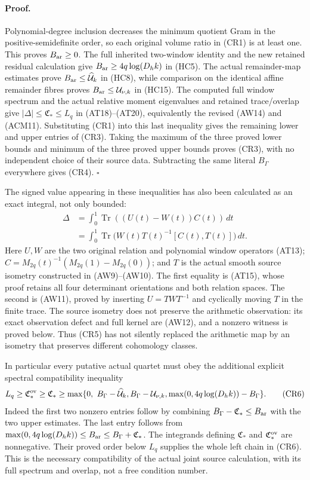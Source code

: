 \paragraph{Proof.}
Polynomial-degree inclusion decreases the minimum quotient Gram in
the positive-semidefinite order, so each original volume ratio in
(CR1) is at least one. This proves $B_{\rm ar}\ge0$.
The full inherited two-window identity and the new retained residual
calculation give $B_{\rm ar}\ge4q\log(D_hk)$ in (HC5).
The actual remainder-map estimates prove
$B_{\rm ar}\le\widehat{\mathcal U}_k$ in (HC8), while comparison
on the identical affine remainder fibres proves
$B_{\rm ar}\le\mathcal U_{\nu,k}$ in (HC15).
The computed full window spectrum and the actual relative moment
eigenvalues and retained trace/overlap give
$|\Delta|\le\mathfrak C_*\le L_q$ in (AT18)--(AT20),
equivalently the revised (AW14) and (ACM11).
Substituting (CR1) into this last inequality gives the remaining lower
and upper entries of (CR3). Taking the maximum of the three proved
lower bounds and minimum of the three proved upper bounds proves
(CR3), with no independent choice of their source data. Subtracting
the same literal $B_\Gamma$ everywhere gives (CR4).
\hfill$\square$

The signed value appearing in these inequalities has also been
calculated as an exact integral, not only bounded:
\[
\begin{split}
\Delta
 &=\int_0^1\operatorname{Tr}((U(t)-W(t))C(t))\,dt\\
 &=\int_0^1\operatorname{Tr}
       \bigl(W(t)T(t)^{-1}[C(t),T(t)]\bigr)\,dt .
\end{split}                                                   \tag{CR5}
\]
Here $U,W$ are the two original relation and polynomial window
operators (AT13); $C=M_{2q}(t)^{-1}(M_{2q}(1)-M_{2q}(0))$;
and $T$ is the actual smooth source isometry constructed in (AW9)--(AW10).
The first equality is (AT15), whose proof retains all four determinant
orientations and both relation spaces. The second is (AW11), proved
by inserting $U=TWT^{-1}$ and cyclically moving $T$ in the finite
trace. The source isometry does not preserve the arithmetic
observation: its exact observation defect and full kernel are (AW12),
and a nonzero witness is proved below.
Thus (CR5) has not silently replaced the arithmetic map by an isometry
that preserves different cohomology classes.

In particular every putative actual quartet must obey the additional
explicit spectral compatibility inequality
\[
 L_q\ge\mathfrak C_*^{\rm ov}\ge\mathfrak C_*\ge
 \max\{0,\ B_\Gamma-\widehat{\mathcal U}_k,
              B_\Gamma-\mathcal U_{\nu,k},
              \max(0,4q\log(D_hk))-B_\Gamma\}.          \tag{CR6}
\]
Indeed the first two nonzero entries follow by combining
$B_\Gamma-\mathfrak C_*\le B_{\rm ar}$ with the two upper estimates.
The last entry follows from
$\max(0,4q\log(D_hk))\le B_{\rm ar}\le B_\Gamma+\mathfrak C_*$.
The integrands defining $\mathfrak C_*$ and
$\mathfrak C_*^{\rm ov}$ are nonnegative. Their proved order
below $L_q$ supplies the whole left chain in (CR6). This is the
necessary compatibility of the actual joint source calculation,
with its full spectrum and overlap, not a free condition number.


